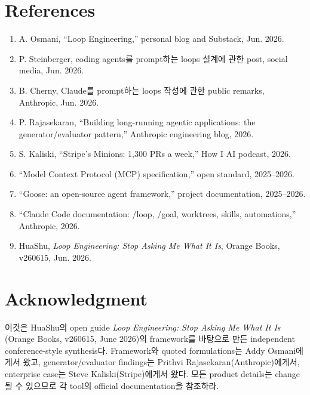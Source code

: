 \documentclass[conference]{IEEEtran}
\begin{document}
\section*{References}
\begin{footnotesize}
\begin{enumerate}
\item[{[1]}] A. Osmani, ``Loop Engineering,'' personal blog and Substack, Jun. 2026.
\item[{[2]}] P. Steinberger, coding agents를 prompt하는 loops 설계에 관한 post, social media, Jun. 2026.
\item[{[3]}] B. Cherny, Claude를 prompt하는 loops 작성에 관한 public remarks, Anthropic, Jun. 2026.
\item[{[4]}] P. Rajasekaran, ``Building long-running agentic applications: the generator/evaluator pattern,'' Anthropic engineering blog, 2026.
\item[{[5]}] S. Kaliski, ``Stripe's Minions: 1,300 PRs a week,'' How I AI podcast, 2026.
\item[{[6]}] ``Model Context Protocol (MCP) specification,'' open standard, 2025--2026.
\item[{[7]}] ``Goose: an open-source agent framework,'' project documentation, 2025--2026.
\item[{[8]}] ``Claude Code documentation: /loop, /goal, worktrees, skills, automations,'' Anthropic, 2026.
\item[{[9]}] HuaShu, \emph{Loop Engineering: Stop Asking Me What It Is}, Orange Books, v260615, Jun. 2026.
\end{enumerate}
\end{footnotesize}

\section*{Acknowledgment}
이것은 HuaShu의 open guide \emph{Loop Engineering: Stop Asking Me What It Is} (Orange Books, v260615, June 2026)의 framework를 바탕으로 만든 independent conference-style synthesis다. Framework와 quoted formulations는 Addy Osmani에게서 왔고, generator/evaluator findings는 Prithvi Rajasekaran(Anthropic)에게서, enterprise case는 Steve Kaliski(Stripe)에게서 왔다. 모든 product details는 change될 수 있으므로 각 tool의 official documentation을 참조하라.
\end{document}
